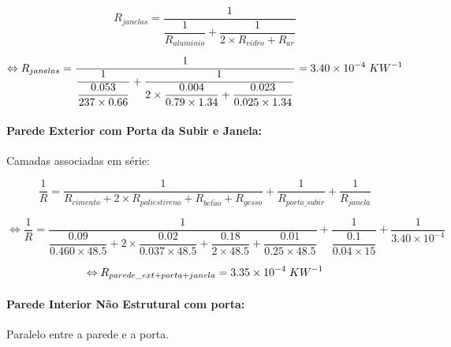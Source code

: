 \documentclass[12pt, a4paper]{article}
\begin{document}
\begin{equation}
	R_{janelas} = \dfrac{1}{\dfrac{1}{R_{aluminio}} + \dfrac{1}{2 \times R_{vidro} + R_{ar}}}
	\label{eq:zona_a_janelas}
\end{equation}

\begin{equation}
	\Leftrightarrow
	R_{janelas} =
	\dfrac{1}{
		\dfrac{1}{
			\dfrac{0.053}{237 \times 0.66}
		}+
		\dfrac{1}{
			2 \times \dfrac{0.004}{0.79 \times 1.34} +
			\dfrac{0.023}{0.025 \times 1.34}
		}
	}
		= 3.40 \times 10^{-4} \hspace{1mm} KW^{-1}
	\label{eq:zona_a_janelas2}
\end{equation}


\paragraph{Parede Exterior com Porta da Subir e Janela:}\label{par:zona_a_ext}Camadas associadas em série:

\begin{equation}
    \dfrac{1}{R}= 
		\dfrac{1}{
			R_{cimento} + 2 \times R_{poliestireno} + R_{bet\tilde{a}o} + R_{gesso}
		}
		+
		\dfrac{1}{
			R_{porta\_subir}
		}
		+
		\dfrac{1}{
			R_{janela}
		}
    \label{eq:zona_a_ext_1}
\end{equation}

\begin{equation}
    \Leftrightarrow \dfrac{1}{R}=
		\dfrac{1}{
			\dfrac{0.09}{0.460 \times 48.5} +
			2 \times \dfrac{0.02}{0.037 \times 48.5} +
			\dfrac{0.18}{2 \times 48.5} +
			\dfrac{0.01}{0.25 \times 48.5}
        }
		+
		\dfrac{1}{
        	\dfrac{0.1}{0.04 \times 15}
		}
		+
		\dfrac{1}{
        	3.40 \times 10^{-4}
		}
    \label{eq:zona_a_ext_2}
\end{equation}

\begin{equation}
	\Leftrightarrow R_{parede\_ext + porta + janela} = 3.35 \times 10^{-4} \hspace{1mm} KW^{-1}
	\label{eq:zona_a_ext_3}
\end{equation}

\paragraph{Parede Interior N\~ao Estrutural com porta:}\label{par:zona_a_int_n_est}Paralelo entre a parede e a porta.
\end{document}
